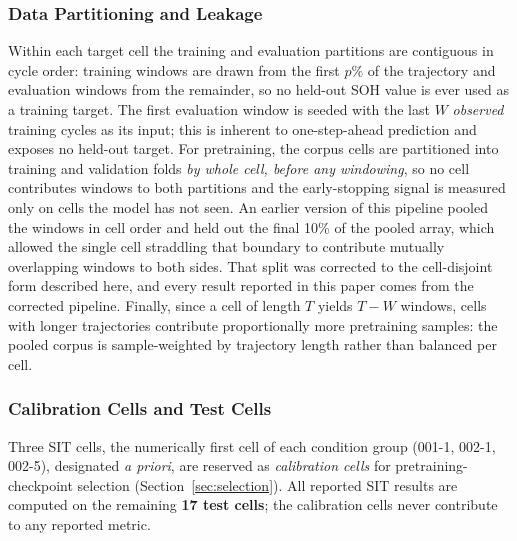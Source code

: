 \subsubsection{Data Partitioning and Leakage}
Within each target cell the training and evaluation partitions are contiguous in
cycle order: training windows are drawn from the first $p\%$ of the trajectory and
evaluation windows from the remainder, so no held-out SOH value is ever used as a
training target. The first evaluation window is seeded with the last $W$
\emph{observed} training cycles as its input; this is inherent to one-step-ahead
prediction and exposes no held-out target. For pretraining, the corpus cells are
partitioned into training and validation folds \emph{by whole cell, before any
windowing}, so no cell contributes windows to both partitions and the
early-stopping signal is measured only on cells the model has not seen. An earlier
version of this pipeline pooled the windows in cell order and held out the final
10\% of the pooled array, which allowed the single cell straddling that boundary to
contribute mutually overlapping windows to both sides. That split was corrected to
the cell-disjoint form described here, and every result reported in this paper comes
from the corrected pipeline. Finally, since a cell of length
$T$ yields $T-W$ windows, cells with longer trajectories contribute proportionally
more pretraining samples: the pooled corpus is sample-weighted by trajectory
length rather than balanced per cell.

\subsubsection{Calibration Cells and Test Cells}
Three SIT cells, the numerically first cell of each condition group
(001-1, 002-1, 002-5), designated \emph{a priori}, are reserved as
\emph{calibration cells} for pretraining-checkpoint selection
(Section~\ref{sec:selection}).
All reported SIT results are computed on the remaining \textbf{17 test cells};
the calibration cells never contribute to any reported metric.

